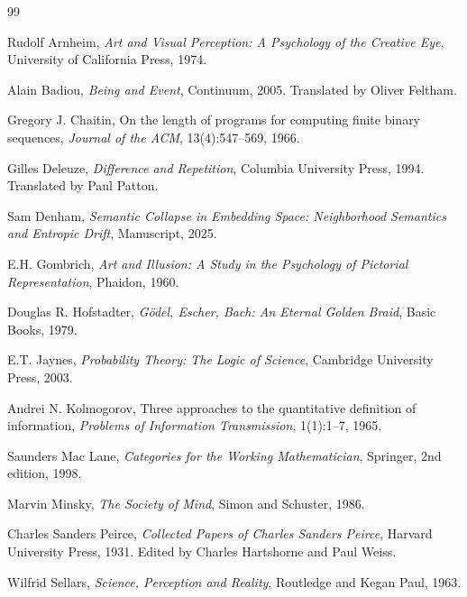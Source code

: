\documentclass[11pt, twoside]{article}
\theoremstyle{plain}
\theoremstyle{definition}
\theoremstyle{remark}
\begin{document}
\begin{thebibliography}{99}

Rudolf Arnheim,
\newblock \emph{Art and Visual Perception: A Psychology of the Creative Eye},
\newblock University of California Press, 1974.

Alain Badiou,
\newblock \emph{Being and Event},
\newblock Continuum, 2005.
\newblock Translated by Oliver Feltham.

Gregory J. Chaitin,
\newblock On the length of programs for computing finite binary sequences,
\newblock \emph{Journal of the ACM}, 13(4):547--569, 1966.

Gilles Deleuze,
\newblock \emph{Difference and Repetition},
\newblock Columbia University Press, 1994.
\newblock Translated by Paul Patton.

Sam Denham,
\newblock \emph{Semantic Collapse in Embedding Space: Neighborhood Semantics and Entropic Drift},
\newblock Manuscript, 2025.

E.H. Gombrich,
\newblock \emph{Art and Illusion: A Study in the Psychology of Pictorial Representation},
\newblock Phaidon, 1960.

Douglas R. Hofstadter,
\newblock \emph{G\"{o}del, Escher, Bach: An Eternal Golden Braid},
\newblock Basic Books, 1979.

E.T. Jaynes,
\newblock \emph{Probability Theory: The Logic of Science},
\newblock Cambridge University Press, 2003.

Andrei N. Kolmogorov,
\newblock Three approaches to the quantitative definition of information,
\newblock \emph{Problems of Information Transmission}, 1(1):1--7, 1965.

Saunders Mac Lane,
\newblock \emph{Categories for the Working Mathematician},
\newblock Springer, 2nd edition, 1998.

Marvin Minsky,
\newblock \emph{The Society of Mind},
\newblock Simon and Schuster, 1986.

Charles Sanders Peirce,
\newblock \emph{Collected Papers of Charles Sanders Peirce},
\newblock Harvard University Press, 1931.
\newblock Edited by Charles Hartshorne and Paul Weiss.

Wilfrid Sellars,
\newblock \emph{Science, Perception and Reality},
\newblock Routledge and Kegan Paul, 1963.


\end{thebibliography}
\end{document}
